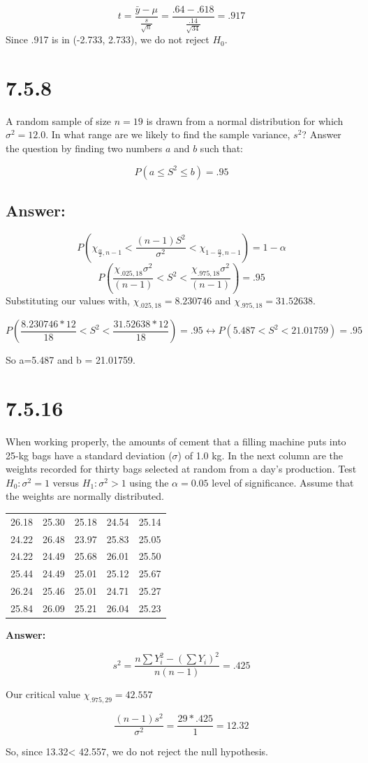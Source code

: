 \documentclass[svgnames]{article}
\begin{document}
$$t= \frac{\bar{y} - \mu}{\frac{s}{\sqrt{n}}}=\frac{.64-.618}{\frac{.14}{\sqrt{34}}}=.917$$
Since .917 is in (-2.733, 2.733), we do not reject $H_0$.

\section{7.5.8}
A random sample of size $n = 19$ is drawn from a normal distribution for which $\sigma^2 = 12.0$. In what range are we likely to find the sample variance, $s^2$? Answer the question by finding two numbers $a$ and $b$ such that:

$$P(a\leq S^2 \leq b) = .95$$

\subsection*{Answer:}
$$P(\chi_{\frac{\alpha}{2}, n-1}<\frac{(n-1)S^2}{\sigma^2}<\chi_{1 -\frac{\alpha}{2}, n-1}) = 1- \alpha $$
$$P(\frac{\chi_{.025, 18}\sigma^2}{(n-1)}<S^2<\frac{\chi_{.975, 18}\sigma^2}{(n-1)}) = .95 $$
Substituting our values with, $\chi_{.025, 18} = 8.230746$ and $\chi_{.975, 18} = 31.52638$.

$$P(\frac{8.230746*12}{18}<S^2<\frac{31.52638*12}{18}) = .95 \leftrightarrow P(5.487<S^2<21.01759) = .95 $$ 

So a=5.487 and b = 21.01759.

\section{7.5.16}

When working properly, the amounts of cement that a filling machine puts into 25-kg bags have a standard deviation ($\sigma$) of 1.0 kg. In the next column are the weights recorded for thirty bags selected at random from a day's production. Test $H_0: \sigma^2 = 1$ versus $H_1: \sigma^2 > 1$ using the $\alpha = 0.05$ level of significance. Assume that the weights are normally distributed.

\begin{table}[h!]
\centering
 \begin{tabular}{c c c c c} 
 \hline
26.18 & 25.30  & 25.18  & 24.54  & 25.14 \\
24.22 &  26.48  & 23.97 &  25.83  & 25.05 \\
24.22  & 24.49 &  25.68  & 26.01  & 25.50 \\
25.44 & 24.49 & 25.01 & 25.12 & 25.67\\
26.24 & 25.46 & 25.01 & 24.71 & 25.27\\
25.84 &26.09& 25.21& 26.04 & 25.23 \\
 \hline
 \end{tabular}
\end{table}

\textbf{Answer:}

$$s^2 = \frac{n\sum Y_i^2 - (\sum Y_i)^2}{n(n-1)}=.425$$

Our critical value $\chi_{.975,29}=42.557$

$$\frac{(n-1)s^2}{\sigma^2}=\frac{29*.425}{1}= 12.32$$

So, since 13.32< 42.557, we do not reject the null hypothesis. 
\end{document}
